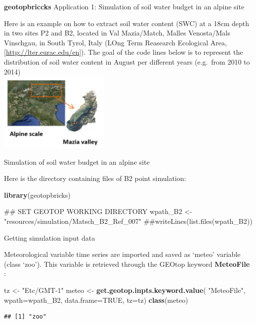 \documentclass[ignorenonframetext,]{beamer}
\newenvironment{Shaded}{\begin{snugshade}}{\end{snugshade}}
\newcommand{\KeywordTok}[1]{\textcolor[rgb]{0.13,0.29,0.53}{\textbf{#1}}}
\newcommand{\DataTypeTok}[1]{\textcolor[rgb]{0.13,0.29,0.53}{#1}}
\newcommand{\StringTok}[1]{\textcolor[rgb]{0.31,0.60,0.02}{#1}}
\newcommand{\OtherTok}[1]{\textcolor[rgb]{0.56,0.35,0.01}{#1}}
\newcommand{\NormalTok}[1]{#1}
\begin{document}
\begin{frame}{\textbf{geotopbriccks} Application 1: Simulation of soil
water budget in an alpine site}

Here is an example on how to extract soil water content (SWC) at a 18cm
depth in two sites P2 and B2, located in Val Mazia/Match, Malles
Venosta/Mals Vinschgau, in South Tyrol, Italy (LOng Term Reasearch
Ecological Area, {[}\url{http://lter.eurac.edu/en}{]}). The goal of the
code lines below is to represent the distribution of soil water content
in August per different years (e.g.~from 2010 to 2014)\\
\includegraphics[width=0.40000\textwidth]{resources/images/mazia_2.png}\\

\end{frame}

\begin{frame}[fragile]{Simulation of soil water budget in an alpine
site}

Here is the directory containing files of B2 point simulation:

\begin{Shaded}
\begin{Highlighting}[]
\KeywordTok{library}\NormalTok{(geotopbricks) }

\NormalTok{## SET GEOTOP WORKING DIRECTORY}
\NormalTok{wpath_B2 <-}\StringTok{ "resources/simulation/Matsch_B2_Ref_007"} 
\NormalTok{##writeLines(list.files(wpath_B2))}
\end{Highlighting}
\end{Shaded}

\end{frame}

\begin{frame}[fragile]{Getting simulation input data}

Meteorological variable time series are imported and saved as `meteo'
variable (class `zoo'). This variable is retrieved through the GEOtop
keyword \textbf{MeteoFile} :

\begin{Shaded}
\begin{Highlighting}[]
\NormalTok{tz <-}\StringTok{ "Etc/GMT-1"}
\NormalTok{meteo <-}\StringTok{ }\KeywordTok{get.geotop.inpts.keyword.value}\NormalTok{(}
  \StringTok{"MeteoFile"}\NormalTok{,}
  \DataTypeTok{wpath=}\NormalTok{wpath_B2,}
  \DataTypeTok{data.frame=}\OtherTok{TRUE}\NormalTok{,}
  \DataTypeTok{tz=}\NormalTok{tz)}
\KeywordTok{class}\NormalTok{(meteo)}
\end{Highlighting}
\end{Shaded}

\begin{verbatim}
## [1] "zoo"
\end{verbatim}

\end{frame}
\end{document}

